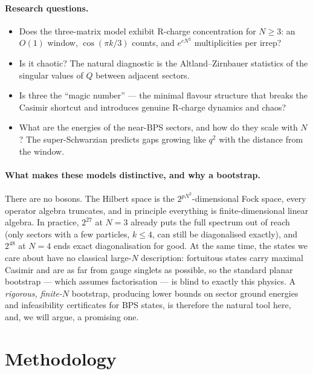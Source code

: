 \documentclass[10pt]{article}
\begin{document}
\paragraph{Research questions.}
\begin{itemize}
\item[Q1.] Does the three-matrix model exhibit R-charge concentration for $N\ge3$: an $O(1)$ window, $\cos(\pi k/3)$ counts, and $e^{cN^2}$ multiplicities per irrep?
\item[Q2.] Is it chaotic? The natural diagnostic is the Altland--Zirnbauer statistics of the singular values of $Q$ between adjacent sectors.
\item[Q3.] Is three the ``magic number'' --- the minimal flavour structure that breaks the Casimir shortcut and introduces genuine R-charge dynamics and chaos?
\item[Q4.] What are the energies of the near-BPS sectors, and how do they scale with $N$? The super-Schwarzian predicts gaps growing like $q^2$ with the distance from the window.
\end{itemize}

\paragraph{What makes these models distinctive, and why a bootstrap.}
There are no bosons. The Hilbert space is the $2^{pN^2}$-dimensional Fock space, every operator algebra truncates, and in principle everything is finite-dimensional linear algebra. In practice, $2^{27}$ at $N=3$ already puts the full spectrum out of reach (only sectors with a few particles, $k\le4$, can still be diagonalised exactly), and $2^{48}$ at $N=4$ ends exact diagonalisation for good. At the same time, the states we care about have no classical large-$N$ description: fortuitous states carry maximal Casimir and are as far from gauge singlets as possible, so the standard planar bootstrap --- which assumes factorisation --- is blind to exactly this physics. A \emph{rigorous, finite-$N$} bootstrap, producing lower bounds on sector ground energies and infeasibility certificates for BPS states, is therefore the natural tool here, and, we will argue, a promising one.

\section{Methodology}
\end{document}
